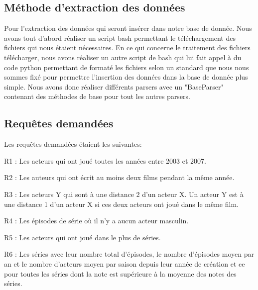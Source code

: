 \documentclass[10pt,a4paper]{article}
\begin{document}
\subsection{Méthode d'extraction des données}

Pour l'extraction des données qui seront insérer dans notre base de donnée. Nous avons tout d'abord réaliser un script bash permettant le téléchargement des fichiers qui nous étaient nécessaires. En ce qui concerne le traitement des fichiers télécharger, nous avons réaliser un autre script de bash qui lui fait appel à du code python permettant de formaté les fichiers selon un standard que nous nous sommes fixé pour permettre l'insertion des données dans la base de donnée plus simple. Nous avons donc réaliser différents parsers avec un "BaseParser" contenant des méthodes de base pour tout les autres parsers.

\subsection{Requêtes demandées}
Les requêtes demandées étaient les suivantes:
\begin{list}{-}{}
  \item R1 : Les acteurs qui ont joué toutes les années entre 2003 et
    2007.
  \item R2 : Les auteurs qui ont écrit au moins deux films pendant la
    même année.
  \item R3 : Les acteurs Y qui sont à une distance 2 d'un acteur X. Un
    acteur Y est à une distance 1 d'un acteur X si ces deux acteurs
    ont joué dans le même film.
  \item R4 : Les épisodes de série où il n'y a aucun acteur masculin.
  \item R5 : Les acteurs qui ont joué dans le plus de séries.
  \item R6 : Les séries avec leur nombre total d'épisodes, le nombre
    d'épisodes moyen par an et le nombre d'acteurs moyen par saison
    depuis leur année de création et ce pour toutes les séries dont la
    note est supérieure à la moyenne des notes des séries.
\end{list}
\end{document}
